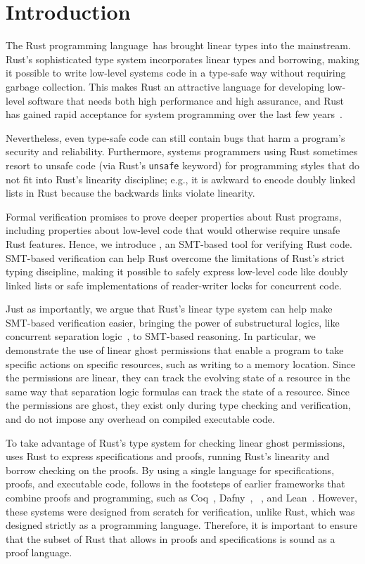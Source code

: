 
\section{Introduction}

The Rust programming language~\rust has brought linear types into the mainstream.
Rust's sophisticated type system incorporates linear types and borrowing,
making it possible to write low-level systems code in a type-safe way
without requiring garbage collection.
This makes Rust an attractive language for developing low-level software
that needs both high performance and high assurance,
and Rust has gained rapid acceptance for system programming over the last
few years~\cite{rustandroid, rustlinux}.

Nevertheless, even type-safe code can still contain bugs
that harm a program's security and reliability.
Furthermore, systems programmers using Rust sometimes resort to unsafe code
(via Rust's \verb`unsafe` keyword)
for programming styles that do not fit into Rust's linearity discipline; e.g.,
it is awkward to encode doubly linked lists in Rust
because the backwards links violate linearity.

Formal verification promises to prove deeper properties about Rust programs,
including properties about low-level code that would otherwise require unsafe Rust features.
Hence, we introduce \verus, an SMT-based tool for verifying Rust code.
SMT-based verification can help
Rust overcome the limitations of Rust's strict typing discipline,
making it possible to safely express low-level code like doubly linked lists
or safe implementations of reader-writer locks for concurrent code.

Just as importantly,
we argue that Rust's linear type system can help make SMT-based verification easier,
bringing the power of substructural logics, like concurrent separation logic~\cite{DBLP:conf/lics/Reynolds02,DBLP:journals/tcs/OHearn07},
to SMT-based reasoning.
In particular, we demonstrate the use of linear ghost permissions
that enable a program to take specific actions on specific resources,
such as writing to a memory location.
Since the permissions are linear, they can track the evolving state of a resource
in the same way that separation logic formulas can track the state of a resource.
Since the permissions are ghost, they exist only during type checking and verification,
and do not impose any overhead on compiled executable code.

To take advantage of Rust's type system for checking linear ghost permissions,
\verus uses Rust to express specifications and proofs,
running Rust's linearity and borrow checking on the proofs.
By using a single language for specifications, proofs, and executable code,
\verus follows in the footsteps of earlier frameworks that combine proofs and programming,
such as Coq~\cite{coq}, Dafny~\cite{DBLP:conf/lpar/Leino10}, \fstar~\cite{mumon}, and Lean~\cite{lean2015}.
However, these systems were designed from scratch for verification,
unlike Rust, which was designed strictly as a programming language.
Therefore, it is important to ensure that the subset of Rust
that \verus allows in proofs and specifications is sound as a proof language.

